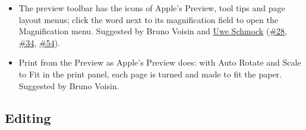 \documentclass[11pt,letterpaper]{article}
\begin{document}
\begin{itemize}
\item The preview toolbar has the icons of Apple’s Preview, tool tips and page layout menus; click the word next to its magnification field to open the Magnification menu. Suggested by Bruno Voisin and \href{https://github.com/Uwe-Schmock}{Uwe Schmock} (\href{https://github.com/TeXShopProject/TeXShop/issues/28}{\#28}, \href{https://github.com/TeXShopProject/TeXShop/issues/34}{\#34}, \href{https://github.com/TeXShopProject/TeXShop/issues/54}{\#54}).
\item Print from the Preview as Apple’s Preview does: with Auto Rotate and Scale to Fit in the print panel, each page is turned and made to fit the paper. Suggested by Bruno Voisin.
\end{itemize}

\subsection{Editing}
\end{document}
